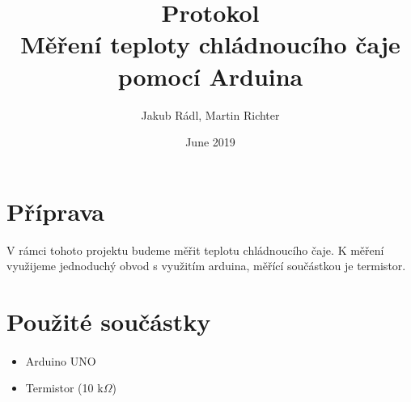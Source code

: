 \documentclass{article}
\title{Protokol\\Měření teploty chládnoucího čaje pomocí Arduina}
\author{Jakub Rádl, Martin Richter}
\date{June 2019}
\begin{document}
\maketitle

\section{Příprava}
V rámci tohoto projektu budeme měřit teplotu chládnoucího čaje. K měření využijeme jednoduchý obvod s využitím arduina, měřící součástkou je termistor.
\section{Použité součástky}
\paragraph{}
\begin{itemize}
    \item Arduino UNO
    \item Termistor (10 k$\Omega$)
\end{itemize}
\end{document}
